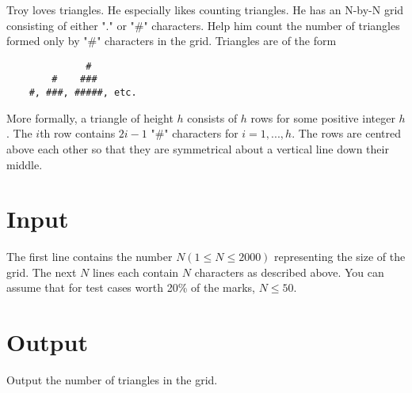 Troy loves triangles. He especially likes counting triangles. He has an N-by-N grid consisting of either "." or "\#" characters. Help him count the number of triangles formed only by "\#" characters in the grid. Triangles are of the form

\begin{verbatim}
              #
        #    ###
    #, ###, #####, etc.
\end{verbatim}

More formally, a triangle of height $h$ consists of $h$ rows for some positive integer $h$. The $i$th row contains $2i-1$ "\#" characters for $i = 1,...,h$. The rows are centred above each other so that they are symmetrical about a vertical line down their middle.


\section*{Input}
The first line contains the number $N (1 \leq N \leq 2000)$ representing the size of the grid. The next $N$ lines each contain $N$ characters as described above. You can assume that for test cases worth 20\% of the marks, $N \leq 50$.

\section*{Output}
Output the number of triangles in the grid.
